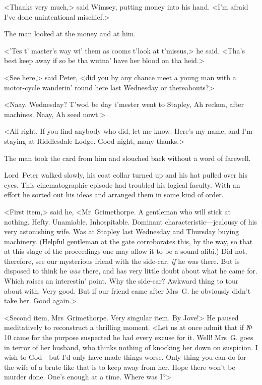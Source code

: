 <Thanks very much,> said Wimsey, putting money into his hand. <I'm afraid I've done unintentional mischief.>

The man looked at the money and at him.

<'Tes t' master's way wi' them as cooms t'look at t'missus,> he said.  <Tha's best keep away if so be tha wutna' have her blood on tha heid.>

<See here,> said Peter, <did you by any chance meet a young man with a motor-cycle wanderin' round here last Wednesday or thereabouts?>

<Naay. Wednesday? T'wod be day t'mester went to Stapley, Ah reckon, after machines. Naay, Ah seed nowt.>

<All right. If you find anybody who did, let me know. Here's my name, and I'm staying at Riddlesdale Lodge. Good night, many thanks.>

The man took the card from him and slouched back without a word of farewell.

\divider

Lord~Peter walked slowly, his coat collar turned up and his hat pulled over his eyes. This cinematographic episode had troubled his logical faculty. With an effort he sorted out his ideas and arranged them in some kind of order.

<First item,> said he, <Mr~Grimethorpe. A gentleman who will stick at nothing. Hefty. Unamiable. Inhospitable. Dominant characteristic—jealousy of his very astonishing wife. Was at Stapley last Wednesday and Thursday buying machinery. (Helpful gentleman at the gate corroborates this, by the way, so that at this stage of the proceedings one may allow it to be a sound alibi.) Did not, therefore, see our mysterious friend with the side-car, \emph{if} he was there. But is disposed to think he \emph{was} there, and has very little doubt about what he came for. Which raises an interestin' point. Why the side-car?  Awkward thing to tour about with. Very good. But if our friend came after Mrs~G\@. he obviously didn't take her. Good again.>

<Second item, Mrs~Grimethorpe. Very singular item. By Jove!> He paused meditatively to reconstruct a thrilling moment. <Let us at once admit that if № 10 came for the purpose suspected he had every excuse for it. Well! Mrs~G\@. goes in terror of her husband, who thinks nothing of knocking her down on suspicion. I wish to God—but I'd only have made things worse. Only thing you can do for the wife of a brute like that is to keep away from her. Hope there won't be murder done. One's enough at a time. Where was I\@?>

